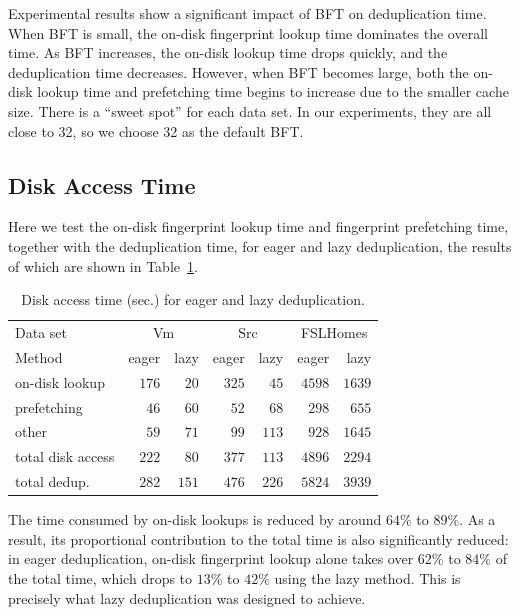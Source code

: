 \documentclass[prodmode,acmtecs]{acmsmall}
\begin{document}
Experimental results show a significant impact of BFT on deduplication time. When BFT is small, the on-disk fingerprint lookup time dominates the overall time. As BFT increases, the on-disk lookup time drops quickly, and the deduplication time decreases. However, when BFT becomes large, both the on-disk lookup time and prefetching time begins to increase due to the smaller cache size. There is a ``sweet spot'' for each data set. In our experiments, they are all close to 32, so we choose 32 as the default BFT.

\subsection{Disk Access Time}

Here we test the on-disk fingerprint lookup time and fingerprint prefetching time, together with the deduplication time, for eager and lazy deduplication, the results of which are shown in Table~\ref{tab:disk-bar}.

\begin{table}[htp]
\centering
\begin{tabular}{lrrrrrr}
\toprule
Data set & \multicolumn{2}{c}{Vm} & \multicolumn{2}{c}{Src} & \multicolumn{2}{c}{FSLHomes} \\
\cmidrule(lr){2-3} \cmidrule(lr){4-5} \cmidrule(lr){6-7}
Method & eager & lazy & eager & lazy & eager & lazy \\
\midrule
on-disk lookup & $176$ & $20$ & $325$ & $45$ & $4598$ & $1639$ \\
prefetching & $46$ & $60$ & $52$ & $68$ & $298$ & $655$ \\
other & $59$ & $71$ & $99$ & $113$ & $928$ & $1645$ \\
\midrule
total disk access & $222$ & $80$ & $377$ & $113$ & $4896$ & $2294$ \\
\midrule
total dedup. & $282$ & $151$ & $476$ & $226$ & $5824$ & $3939$\\
\bottomrule
\end{tabular}
\caption{Disk access time (sec.) for eager and lazy deduplication.}
\label{tab:disk-bar}
\end{table}

The time consumed by on-disk lookups is reduced by around $64\%$ to $89\%$. As a result, its proportional contribution to the total time is also significantly reduced: in eager deduplication, on-disk fingerprint lookup alone takes over $62\%$ to $84\%$ of the total time, which drops to $13\%$ to $42\%$ using the lazy method.  This is precisely what lazy deduplication was designed to achieve.
\end{document}
